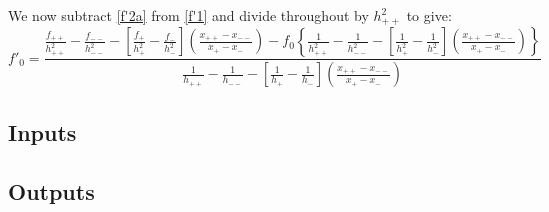 We now subtract \cref{f'2a} from \cref{f'1} and divide throughout by $h_{++}^2$ to give:
\begin{equation}
f'_0 = \frac{\frac{f_{++}}{h_{++}^2} - \frac{f_{--}}{h_{--}^2} - \left[\frac{f_+}{h_+^2} - \frac{f_-}{h_-^2} \right] \left(\frac{x_{++} - x_{--}}{x_+ - x_-} \right) - f_0 \left\lbrace \frac{1}{h_{++}^2} - \frac{1}{h_{--}^2} - \left[\frac{1}{h_+^2} - \frac{1}{h_-^2} \right] \left(\frac{x_{++} - x_{--}}{x_+ - x_-} \right) \right\rbrace}{ \frac{1}{h_{++}} - \frac{1}{h_{--}} - \left[ \frac{1}{h_+} - \frac{1}{h_-} \right] \left(\frac{x_{++} - x_{--}}{x_+ - x_-}\right) }
\end{equation}


\subsection{Inputs}

\subsection{Outputs}